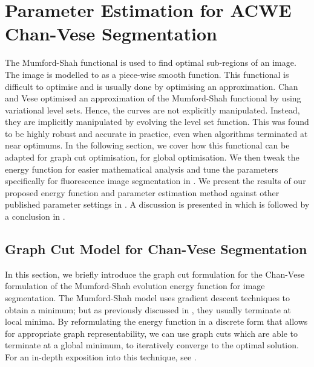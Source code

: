 
\chapter{Parameter Estimation for ACWE Chan-Vese Segmentation} %

\label{chap:Chapter5} %


The Mumford-Shah functional \citep{Mumford1989} is used to find optimal sub-regions of an image. The image is modelled to as a piece-wise smooth function. This functional is difficult to optimise and is usually done by optimising an approximation. Chan and Vese \citep{Chan2001} optimised an approximation of the Mumford-Shah functional by using variational level sets. Hence, the curves are not explicitly manipulated. Instead, they are implicitly manipulated by evolving the level set function. This was found to be highly robust and accurate in practice, even when algorithms terminated at near optimums. In the following section, we cover how this functional can be adapted for graph cut optimisation, for global optimisation. We then tweak the energy function for easier mathematical analysis and tune the parameters specifically for fluorescence image segmentation in . We present the results of our proposed energy function and parameter estimation method against other published parameter settings in . A discussion is presented in  which is followed by a conclusion in .

\section{Graph Cut Model for Chan-Vese Segmentation}
\label{sec:chanveseGC}

In this section, we briefly introduce the graph cut formulation for the Chan-Vese formulation of the Mumford-Shah evolution energy function for image segmentation. The Mumford-Shah model uses gradient descent techniques to obtain a minimum; but as previously discussed in , they usually terminate at local minima. By reformulating the energy function in a discrete form that allows for appropriate graph representability, we can use graph cuts which are able to terminate at a global minimum, to iteratively converge to the optimal solution. For an in-depth exposition into this technique, see \citep{Mumford1989,Chan2001,ElZehiry2007}.

